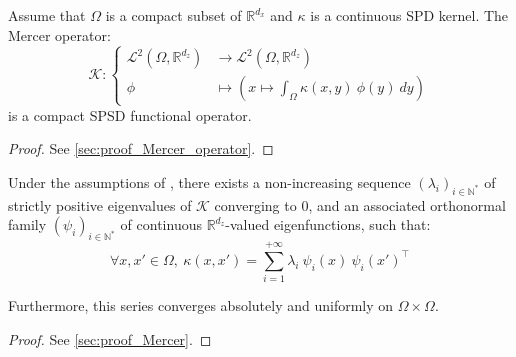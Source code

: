\begin{proposition}\label{th:covariance_operator}
	Assume that $\Omega$ is a compact subset of $\mathbb{R}^{d_x}$ and $\kappa$ is a continuous SPD kernel. The Mercer operator:
	\begin{equation}
		\mathcal{K}:\left\{\begin{aligned}
		\mathcal{L}^2(\Omega,\mathbb{R}^{d_z})&\to\mathcal{L}^2(\Omega,\mathbb{R}^{d_z})\\
		\phi&\mapsto\left(x\mapsto\int_{\Omega}{\kappa(x,y)\:\phi(y)\:dy}\right)
		\end{aligned}\right.
	\end{equation}
	is a compact SPSD functional operator.
\end{proposition}

\begin{proof}
	See \cref{sec:proof_Mercer_operator}.
\end{proof}

\begin{proposition}\label{th:Mercer}
	Under the assumptions of , there exists a non-increasing sequence $(\lambda_i)_{i\in\mathbb{N}^*}$ of strictly positive eigenvalues of $\mathcal{K}$ converging to $0$, and an associated orthonormal family $(\psi_i)_{i\in\mathbb{N}^*}$ of continuous $\mathbb{R}^{d_z}$-valued eigenfunctions, such that:
	\begin{equation}
		\forall x,x'\in\Omega,\:\kappa(x,x')=\sum_{i=1}^{+\infty}\lambda_i\:\psi_i(x)\:\psi_i(x')^\top\label{eq:Mercer}
	\end{equation}

	Furthermore, this series converges absolutely and uniformly on $\Omega\times\Omega$.
\end{proposition}

\begin{proof}
	See \cref{sec:proof_Mercer}.
\end{proof}

